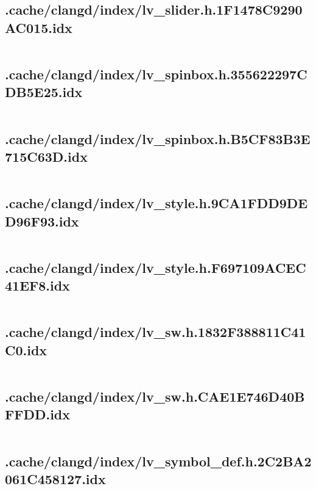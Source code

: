 \subsection{.cache/clangd/index/lv_slider.h.1F1478C9290AC015.idx}
\inputminted[linenos,tabsize=2,breaklines, breakanywhere]{c}{lv_slider.h.1F1478C9290AC015.idx}
\pagebreak

\subsection{.cache/clangd/index/lv_spinbox.h.355622297CDB5E25.idx}
\inputminted[linenos,tabsize=2,breaklines, breakanywhere]{c}{lv_spinbox.h.355622297CDB5E25.idx}
\pagebreak

\subsection{.cache/clangd/index/lv_spinbox.h.B5CF83B3E715C63D.idx}
\inputminted[linenos,tabsize=2,breaklines, breakanywhere]{c}{lv_spinbox.h.B5CF83B3E715C63D.idx}
\pagebreak

\subsection{.cache/clangd/index/lv_style.h.9CA1FDD9DED96F93.idx}
\inputminted[linenos,tabsize=2,breaklines, breakanywhere]{c}{lv_style.h.9CA1FDD9DED96F93.idx}
\pagebreak

\subsection{.cache/clangd/index/lv_style.h.F697109ACEC41EF8.idx}
\inputminted[linenos,tabsize=2,breaklines, breakanywhere]{c}{lv_style.h.F697109ACEC41EF8.idx}
\pagebreak

\subsection{.cache/clangd/index/lv_sw.h.1832F388811C41C0.idx}
\inputminted[linenos,tabsize=2,breaklines, breakanywhere]{c}{lv_sw.h.1832F388811C41C0.idx}
\pagebreak

\subsection{.cache/clangd/index/lv_sw.h.CAE1E746D40BFFDD.idx}
\inputminted[linenos,tabsize=2,breaklines, breakanywhere]{c}{lv_sw.h.CAE1E746D40BFFDD.idx}
\pagebreak

\subsection{.cache/clangd/index/lv_symbol_def.h.2C2BA2061C458127.idx}
\inputminted[linenos,tabsize=2,breaklines, breakanywhere]{c}{lv_symbol_def.h.2C2BA2061C458127.idx}
\pagebreak

